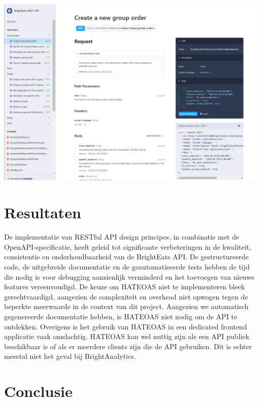 \documentclass[a0,portrait]{hogent-poster}
\begin{document}
\begin{multicols}{2}
\begin{center}
  \captionsetup{type=figure}
  \includegraphics[width=1.0\linewidth]{./graphics/scramble.png}
\end{center}

\section{Resultaten}

De implementatie van RESTful API design principes, in combinatie met de OpenAPI-specificatie, heeft geleid tot significante verbeteringen in de kwaliteit, consistentie en onderhoudbaarheid van de BrightEats API. De gestructureerde code, de uitgebreide documentatie en de geautomatiseerde tests hebben de tijd die nodig is voor debugging aanzienlijk verminderd en het toevoegen van nieuwe features vereenvoudigd. De keuze om HATEOAS niet te implementeren bleek gerechtvaardigd, aangezien de complexiteit en overhead niet opwogen tegen de beperkte meerwaarde in de context van dit project. Aangezien we automatisch gegenereerde documentatie hebben, is HATEOAS niet nodig om de API te ontdekken. Overigens is het gebruik van HATEOAS in een dedicated frontend applicatie vaak omslachtig. HATEOAS kan wel nuttig zijn als een API publiek beschikbaar is of als er meerdere clients zijn die de API gebruiken. Dit is echter meestal niet het geval bij BrightAnalytics.

\section{Conclusie}


\end{multicols}
\end{document}
